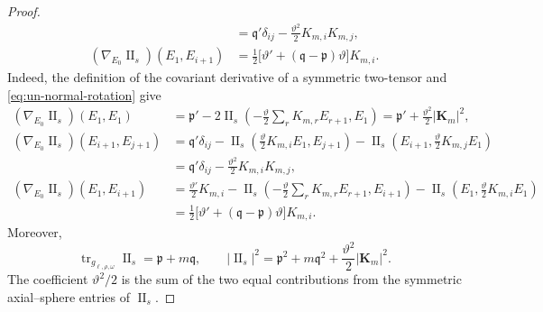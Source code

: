 \documentclass[11pt,reqno]{amsart}
\theoremstyle{definition}
\numberwithin{equation}{section}
\DeclareMathOperator{\II}{II}
\begin{document}
\begin{proof}
\begin{align*}
 &=\mathfrak q'\delta_{ij}-\frac{\vartheta^2}{2}K_{m,i}K_{m,j},\\
 (\nabla_{E_0}\II_s)(E_1,E_{i+1})
 &=\frac12\bigl[\vartheta'+(\mathfrak q-\mathfrak p)\vartheta\bigr]K_{m,i}.
\end{align*}
Indeed, the definition of the covariant derivative of a symmetric
two-tensor and \eqref{eq:un-normal-rotation} give
\begin{align*}
 (\nabla_{E_0}\II_s)(E_1,E_1)
 &=\mathfrak p'
   -2\II_s\left(-\frac{\vartheta}{2}
       \sum_r K_{m,r}E_{r+1},E_1\right)
 =\mathfrak p'+\frac{\vartheta^2}{2}\lvert\mathbf K_m\rvert^2,\\
 (\nabla_{E_0}\II_s)(E_{i+1},E_{j+1})
 &=\mathfrak q'\delta_{ij}
   -\II_s\left(\frac{\vartheta}{2}K_{m,i}E_1,E_{j+1}\right)
   -\II_s\left(E_{i+1},\frac{\vartheta}{2}K_{m,j}E_1\right)\\
 &=\mathfrak q'\delta_{ij}-\frac{\vartheta^2}{2}K_{m,i}K_{m,j},\\
 (\nabla_{E_0}\II_s)(E_1,E_{i+1})
 &=\frac{\vartheta'}2 K_{m,i}
   -\II_s\left(-\frac{\vartheta}{2}
       \sum_r K_{m,r}E_{r+1},E_{i+1}\right)
   -\II_s\left(E_1,\frac{\vartheta}{2}K_{m,i}E_1\right)\\
 &=\frac12\bigl[\vartheta'+(\mathfrak q-\mathfrak p)\vartheta\bigr]K_{m,i}.
\end{align*}
Moreover,
\[
 \operatorname{tr}_{g_{\ell,\rho,\omega}}\II_s=\mathfrak p+m\mathfrak q,
 \qquad
 |\II_s|^2=\mathfrak p^2+m\mathfrak q^2
   +\frac{\vartheta^2}{2}\lvert\mathbf K_m\rvert^2.
\]
The coefficient \(\vartheta^2/2\) is the sum of the two equal contributions
from the symmetric axial--sphere entries of \(\II_s\).


\end{proof}
\end{document}
